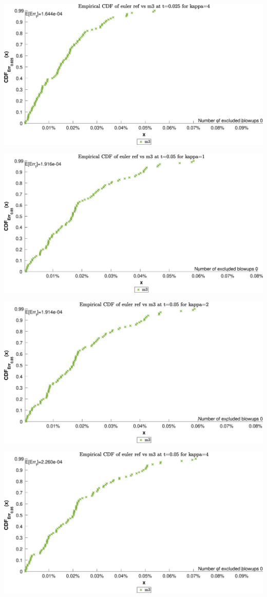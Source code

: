 \begin{landscape}
\includegraphics[width=.95\columnwidth]{CDF/CDFEulerRef_30}
\end{landscape}
\begin{landscape}
\includegraphics[width=.95\columnwidth]{CDF/CDFEulerRef_31}
\end{landscape}
\begin{landscape}
\includegraphics[width=.95\columnwidth]{CDF/CDFEulerRef_32}
\end{landscape}
\begin{landscape}
\includegraphics[width=.95\columnwidth]{CDF/CDFEulerRef_33}
\end{landscape}
